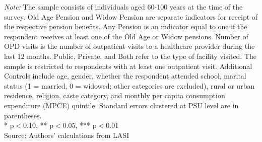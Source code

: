 \begin{table}[H]
{\begin{tabular}{lccccccccc}
\bottomrule
\end{tabular}
}
\vspace{2mm}
\begin{minipage}{0.95\textwidth}
\footnotesize \textit{Note:} The sample consists of individuals aged 60-100 years at the time of the survey. Old Age Pension and Widow Pension are separate indicators for receipt of the respective pension benefits. Any Pension is an indicator equal to one if the respondent receives at least one of the Old Age or Widow pensions. Number of OPD visits is the number of outpatient visits to a healthcare provider during the last 12 months. Public, Private, and Both refer to the type of facility visited. The sample is restricted to respondents with at least one outpatient visit. Additional Controls include age, gender, whether the respondent attended school, marital status (1 = married, 0 = widowed; other categories are excluded), rural or urban residence, religion, caste category, and monthly per capita consumption expenditure (MPCE) quintile. Standard errors clustered at PSU level are in parentheses. \\ * p$<$0.10, ** p$<$0.05, *** p$<$0.01\\
Source: Authors' calculations from LASI
\end{minipage}
\end{table}
